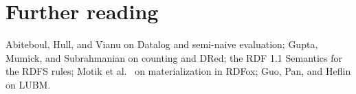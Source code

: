 \section*{Further reading}
Abiteboul, Hull, and Vianu \cite{alicebook} on Datalog and semi-naive
evaluation; Gupta, Mumick, and Subrahmanian \cite{gupta1993} on counting and
DRed; the RDF 1.1 Semantics \cite{rdfsemantics} for the RDFS rules; Motik et
al.\ \cite{rdfox} on materialization in RDFox; Guo, Pan, and Heflin \cite{lubm}
on LUBM.
